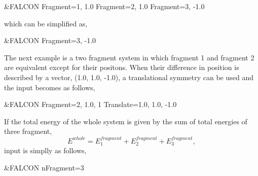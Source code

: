 \begin{inputlisting}
 &FALCON
 Fragment=1,  1.0
 Fragment=2,  1.0
 Fragment=3, -1.0
\end{inputlisting}

which can be simplified as,

\begin{inputlisting}
 &FALCON
 Fragment=3, -1.0
\end{inputlisting}

The next example is a two fragment system in which fragment 1 and fragment 2
are equivalent except for their positons.
When their difference in position is described by a vector, (1.0, 1.0, -1.0),
a translational symmetry can be used and the input becomes as follows,

\begin{inputlisting}
 &FALCON
 Fragment=2, 1.0, 1
 Translate=1.0, 1.0, -1.0
\end{inputlisting}

If the total energy of the whole system is given by the sum of total energies
of three fragment,
\[
   E^{whole}= E_1^{fragment} + E_2^{fragment} + E_3^{fragment},
\]
input is simplly as follows,

\begin{inputlisting}
 &FALCON
 nFragment=3
\end{inputlisting}
